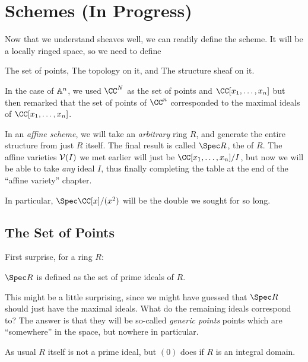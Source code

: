 \chapter{Schemes (In Progress)}
Now that we understand sheaves well, we can readily define the scheme.
It will be a locally ringed space, so we need to define
\begin{itemize}
	\ii The set of points,
	\ii The topology on it, and
	\ii The structure sheaf on it.
\end{itemize}

In the case of $\mathbb A^n$, we used $\CC^N$ as the set of points
and $\CC[x_1, \dots, x_n]$ but then remarked that the set of points
of $\CC^n$ corresponded to the maximal ideals of $\CC[x_1, \dots, x_n]$.

In an \emph{affine scheme}, we will take an \emph{arbitrary} ring $R$,
and generate the entire structure from just $R$ itself.
The final result is called $\Spec R$, the  of $R$.
The affine varieties $\mathcal V(I)$ we met earlier will just be
$\CC[x_1, \dots, x_n] / I$, but now we will be able to take
\emph{any} ideal $I$, thus finally completing the table at the end
of the ``affine variety'' chapter.

In particular, $\Spec \CC[x] / (x^2)$ will be the double we sought for so long.

\section{The Set of Points}

First surprise, for a ring $R$:
\begin{moral}
	$\Spec R$ is defined as the set of prime ideals of $R$.
\end{moral}

This might be a little surprising, since we might have guessed
that $\Spec R$ should just have the maximal ideals.
What do the remaining ideals correspond to?
The answer is that they will be so-called \emph{generic points}
points which are ``somewhere'' in the space, but nowhere in particular.

\begin{remark}
	As usual $R$ itself is not a prime ideal, but $(0)$
	does if $R$ is an integral domain.
\end{remark}

